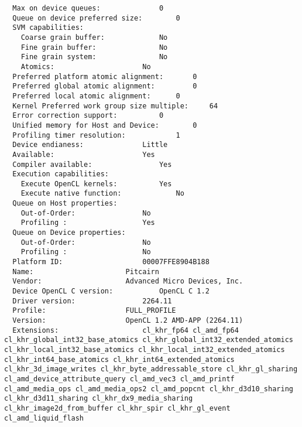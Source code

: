 \documentclass[12pt]{article}
\begin{document}
\begin{lstlisting}
  Max on device queues:				 0
  Queue on device preferred size:		 0
  SVM capabilities:				 
    Coarse grain buffer:			 No
    Fine grain buffer:				 No
    Fine grain system:				 No
    Atomics:					 No
  Preferred platform atomic alignment:		 0
  Preferred global atomic alignment:		 0
  Preferred local atomic alignment:		 0
  Kernel Preferred work group size multiple:	 64
  Error correction support:			 0
  Unified memory for Host and Device:		 0
  Profiling timer resolution:			 1
  Device endianess:				 Little
  Available:					 Yes
  Compiler available:				 Yes
  Execution capabilities:				 
    Execute OpenCL kernels:			 Yes
    Execute native function:			 No
  Queue on Host properties:				 
    Out-of-Order:				 No
    Profiling :					 Yes
  Queue on Device properties:				 
    Out-of-Order:				 No
    Profiling :					 No
  Platform ID:					 00007FFE8904B188
  Name:						 Pitcairn
  Vendor:					 Advanced Micro Devices, Inc.
  Device OpenCL C version:			 OpenCL C 1.2 
  Driver version:				 2264.11
  Profile:					 FULL_PROFILE
  Version:					 OpenCL 1.2 AMD-APP (2264.11)
  Extensions:					 cl_khr_fp64 cl_amd_fp64 cl_khr_global_int32_base_atomics cl_khr_global_int32_extended_atomics cl_khr_local_int32_base_atomics cl_khr_local_int32_extended_atomics cl_khr_int64_base_atomics cl_khr_int64_extended_atomics cl_khr_3d_image_writes cl_khr_byte_addressable_store cl_khr_gl_sharing cl_amd_device_attribute_query cl_amd_vec3 cl_amd_printf cl_amd_media_ops cl_amd_media_ops2 cl_amd_popcnt cl_khr_d3d10_sharing cl_khr_d3d11_sharing cl_khr_dx9_media_sharing cl_khr_image2d_from_buffer cl_khr_spir cl_khr_gl_event cl_amd_liquid_flash 



\end{lstlisting}
\end{document}
